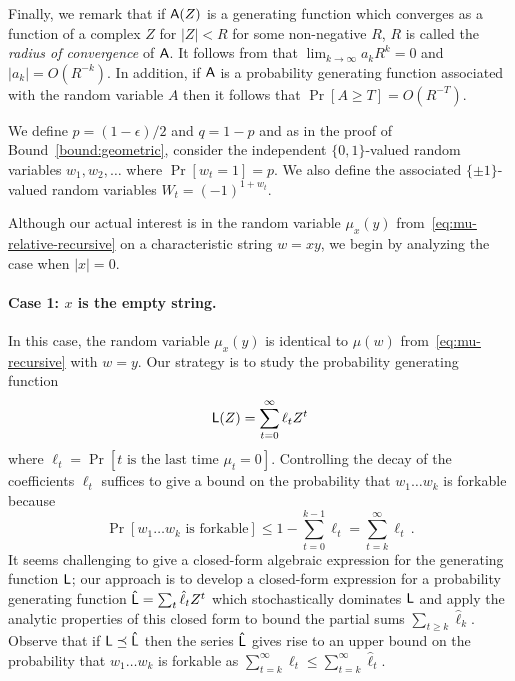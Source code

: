   Finally, we remark that
  if $\mathsf{A}(Z)$ is a generating function which converges as a
  function of a complex $Z$ for $|Z| < R$ for some non-negative $R$, 
  $R$ is called the \emph{radius of convergence} of $\mathsf{A}$.  
  It follows from \citep[Theorem 2.19]{WilfGF} that 
  $\lim_{k \rightarrow \infty} {a_k}R^k = 0$ and $|a_k| = O(R^{-k})$. 
	In addition, if $\mathsf{A}$ is a probability generating function associated with the
  random variable $A$ then it follows that
  $\Pr[A \geq T] = O(R^{-T})$.
  
  We define $p = (1 - \epsilon)/2$ and $q = 1 - p$ and 
  as in the proof of Bound~\ref{bound:geometric},
  consider the independent $\{0,1\}$-valued random variables
  $w_1, w_2, \ldots$ where $\Pr[w_t = 1] = p$. We also define the
  associated $\{\pm1\}$-valued random variables $W_t =
  (-1)^{1+w_t}$.
	
  
	Although our actual interest is in the random variable $\mu_x(y)$ 
	from~\eqref{eq:mu-relative-recursive} on a characteristic string $w=xy$, 
  we begin by analyzing the case when $|x|=0$. 

	\paragraph{Case 1: $x$ is the empty string.}
  In this case, the random variable $\mu_x(y)$ is identical to $\mu(w)$ 
  from~\eqref{eq:mu-recursive} with $w = y$. 
	Our strategy is to study the probability generating
  function
  \[
    \mathsf{L}(Z) = \sum_{t = 0}^\infty \ell_t Z^t
  \]
  where $\ell_t = \Pr[\text{$t$ is the last time $\mu_t =
    0$}]$. Controlling the decay of the coefficients $\ell_t$ suffices
  to give a bound on the probability that $w_1\ldots w_k$ is forkable
  because
  \[
    \Pr[\text{$w_1 \ldots w_k$ is forkable}] \leq 1 - \sum_{t =
      0}^{k-1} \ell_t = \sum_{t = k}^\infty \ell_t\,.
  \]
  It seems challenging to give a closed-form algebraic expression for
  the generating function $\mathsf{L}$; our approach is to develop a
  closed-form expression for a probability generating function
  $\mathsf{\hat{L}} = \sum_t \hat{\ell}_t Z^t$ which stochastically
  dominates $\mathsf{L}$ and apply the analytic properties of this closed
  form to bound the partial sums $\sum_{t \geq k} \hat{\ell}_k$.
  Observe that if $\mathsf{L} \preceq \mathsf{\hat{L}}$ then the series
  $\mathsf{\hat{L}}$ gives rise to an upper bound on the probability that
  $w_1\ldots w_k$ is forkable as
  $\sum_{t=k}^\infty \ell_t \leq \sum_{t=k}^\infty \hat{\ell}_t$.

